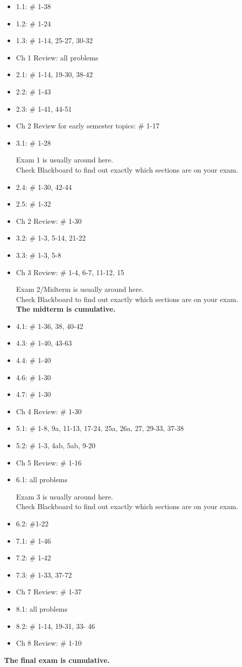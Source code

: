 \documentclass{article}
\begin{document}
\begin{itemize}
\item 1.1:  \# 1-38
\item 1.2:  \# 1-24
\item 1.3:  \# 1-14, 25-27, 30-32
\item Ch 1 Review:  all problems
\item 2.1:  \# 1-14, 19-30, 38-42
\item 2.2:  \# 1-43
\item 2.3:  \# 1-41, 44-51
\item Ch 2 Review for early semester topics: \# 1-17
\item 3.1: \# 1-28
\begin{center}
Exam 1 is usually around here.\\  Check Blackboard to find out exactly which sections are on your exam.
\end{center}
\item 2.4:  \# 1-30, 42-44
\item 2.5: \# 1-32
\item Ch 2 Review: \# 1-30
\item 3.2: \# 1-3, 5-14, 21-22
\item 3.3: \# 1-3, 5-8
\item Ch 3 Review: \# 1-4, 6-7, 11-12, 15
\begin{center}
Exam 2/Midterm is usually around here.\\  Check Blackboard to find out exactly which sections are on your exam.\\
{\bf The midterm is cumulative.}
\end{center}
\newpage\thispagestyle{empty}
\item 4.1:  \# 1-36, 38, 40-42
\item 4.3: \# 1-40, 43-63
\item 4.4: \# 1-40
\item 4.6: \# 1-30
\item 4.7: \# 1-30
\item Ch 4 Review: \# 1-30 
\item 5.1: \# 1-8, 9a, 11-13, 17-24, 25a, 26a, 27, 29-33, 37-38
\item 5.2: \# 1-3, 4ab, 5ab, 9-20
\item Ch 5 Review: \# 1-16
\item 6.1: all problems
\begin{center}
Exam 3 is usually around here.\\  Check Blackboard to find out exactly which sections are on your exam.
\end{center}
\item 6.2: \#1-22
\item 7.1: \# 1-46
\item 7.2: \# 1-42
\item 7.3: \# 1-33, 37-72
\item Ch 7 Review: \# 1-37
\item 8.1: all problems
\item 8.2:  \# 1-14, 19-31, 33- 46
\item Ch 8 Review: \# 1-10
\end{itemize}
\begin{center}
{\bf The final exam is cumulative.}
\end{center}
\end{document}
